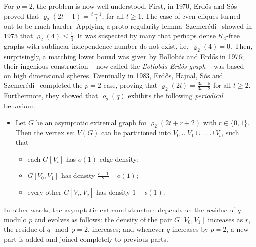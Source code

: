 \documentclass[10pt,a4paper]{article}
\def\pseudop{{\star}}
\newtheorem{theorem}{Theorem}[section]
\theoremstyle{definition}
\begin{document}
For $p=2$, the problem is now well-understood. First, in
1970, Erd\H{o}s and S\'os~\cite{ES} proved that $\varrho_2(2t+1) = \frac{t-1}{t}$, for all $t \geq 1$.
The case of even cliques turned out to be much harder. Applying a proto-regularity lemma, Szemer\'edi~\cite{SzK4} showed in 1973 that $\varrho_2(4) \leq \frac{1}{4}$. It was suspected by many that perhaps dense $K_4$-free graphs with sublinear independence number do not exist, i.e.~$\varrho_2(4)=0$. Then, surprisingly, a matching lower bound was given by Bollob\'as and Erd\H{o}s in 1976; their ingenious construction -- now called the \emph{Bollob\'as-Erd\H{o}s graph} -- was based on high dimensional spheres. 
Eventually in 1983, Erd\H{o}s, Hajnal, S\'os and Szemer\'edi~\cite{EHSSz} completed the $p=2$ case, proving that $\varrho_2(2t)=\frac{3t-5}{3t-2}$ for all $t \geq 2$. Furthermore, they showed that $\varrho_2(q)$ exhibits the following \emph{periodical} behaviour:
\begin{itemize}
	\item[$(\pseudop)$] Let $G$ be an asymptotic extremal graph for $\varrho_2(2t+r+2)$ with $r\in\{0,1\}$. Then the vertex set $V(G)$ can be partitioned into $V_0\cup V_1\cup \ldots \cup V_t$, such that
	\begin{itemize}
		\item each $G[V_i]$ has $o(1)$ edge-density;
		
		\item $G[V_0,V_1]$ has density $\frac{r+1}{2}-o(1)$; 
		
		\item every other $G[V_i,V_j]$ has density $1-o(1)$.
	\end{itemize}
\end{itemize}
In other words, the asymptotic extremal structure depends on the residue of $q$ modulo $p$ and evolves as follows: the density of the pair $G[V_0,V_1]$ increases as $r$, the residue of $q\!\mod p=2$, increases; and whenever $q$ increases by $p=2$, a new part is added and joined completely to previous parts.


\end{document}
